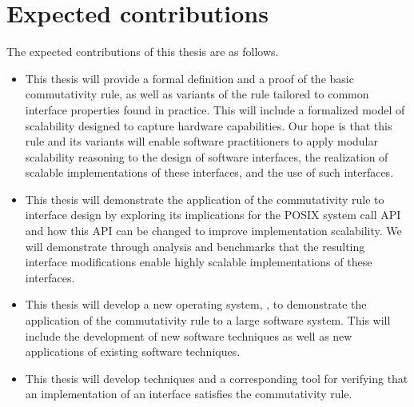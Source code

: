 \section{Expected contributions}

The expected contributions of this thesis are as follows.

\begin{itemize}
\item This thesis will provide a formal definition and a proof of the
  basic commutativity rule, as well as variants of the rule tailored
  to common interface properties found in practice.  This will include
  a formalized model of scalability designed to capture hardware
  capabilities.  Our hope is that this rule and its variants will
  enable software practitioners to apply modular scalability reasoning
  to the design of software interfaces, the realization of scalable
  implementations of these interfaces, and the use of such interfaces.

\item This thesis will demonstrate the application of the
  commutativity rule to interface design by exploring its implications
  for the POSIX system call API and how this API can be changed to
  improve implementation scalability.  We will demonstrate through
  analysis and benchmarks that the resulting interface modifications
  enable highly scalable implementations of these interfaces.

\item This thesis will develop a new operating system, \sys, to
  demonstrate the application of the commutativity rule to a large
  software system.  This will include the development of new software
  techniques as well as new applications of existing software
  techniques.

\item This thesis will develop techniques and a corresponding tool for
  verifying that an implementation of an interface satisfies the
  commutativity rule.
\end{itemize}
